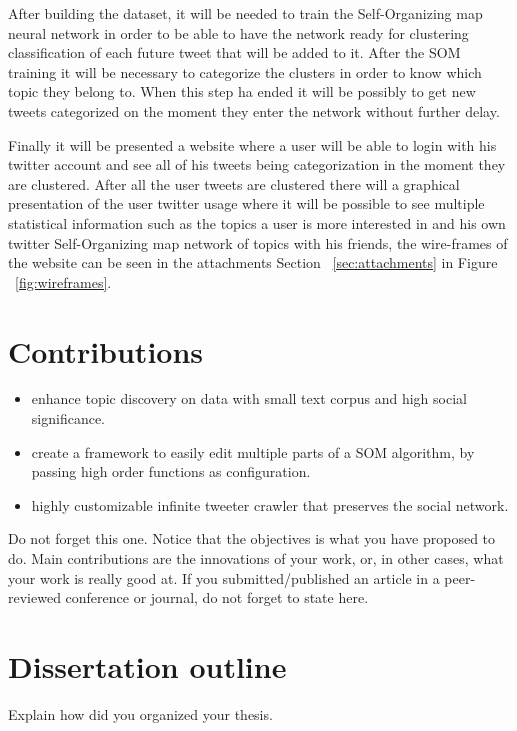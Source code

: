 After building the dataset, it will be needed to train the Self-Organizing map neural network in order to be able to have the network ready for clustering classification of each future tweet that will be added to it. After the SOM training it will be necessary to categorize the clusters in order to know which topic they belong to. When this step ha ended it will be possibly to get new tweets categorized on the moment they enter the network without further delay.

Finally it will be presented a website where a user will be able to login with his twitter account and see all of his tweets being categorization in the moment they are clustered. After all the user tweets are clustered there will a graphical presentation of the user twitter usage where it will be possible to see multiple statistical information such as the topics a user is more interested in and his own twitter Self-Organizing map network of topics with his friends, the wire-frames of the website can be seen in the attachments Section ~\ref{sec:attachments} in Figure ~\ref{fig:wireframes}.
 

\section{Contributions}
\begin{itemize}
  \item enhance topic discovery on data with small text corpus and high social significance.
  \item create a framework to easily edit multiple parts of a SOM algorithm, by passing high order functions as configuration.
  \item highly customizable infinite tweeter crawler that preserves the social network.  
\end{itemize}
Do not forget this one. Notice that the objectives is what you have proposed to do. Main contributions are the innovations of your work, or, in other cases, what your work is really good at. If you submitted/published an article in a peer-reviewed conference or journal, do not forget to state here.

\section{Dissertation outline}
Explain how did you organized your thesis.

\cleardoublepage 

